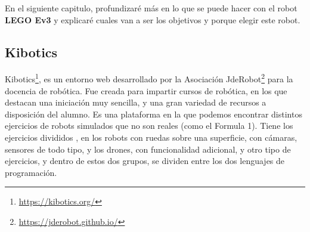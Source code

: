 En el siguiente capitulo, profundizaré más en lo que se puede hacer con el robot \textbf{LEGO Ev3} y explicaré cuales van a ser los objetivos y porque elegir este robot.



\subsection{Kibotics}
\label{sec:kibotics}
Kibotics\footnote{\url{https://kibotics.org/}}\cite{bib:kibotics}, es un entorno web desarrollado por la Asociación JdeRobot\footnote{\url{https://jderobot.github.io/}} para la docencia de robótica. Fue creada para impartir cursos de robótica, en los que destacan una iniciación muy sencilla, y una gran variedad de recursos a disposición del alumno.
Es una plataforma en la que podemos encontrar distintos ejercicios de robots simulados que no son reales (como el Formula 1). Tiene los ejercicios divididos , en los robots con ruedas sobre una superficie, con cámaras, sensores de todo tipo, y los drones, con funcionalidad adicional, y otro tipo de ejercicios, y dentro de estos dos grupos, se dividen entre los dos lenguajes de programación. \newline
 
